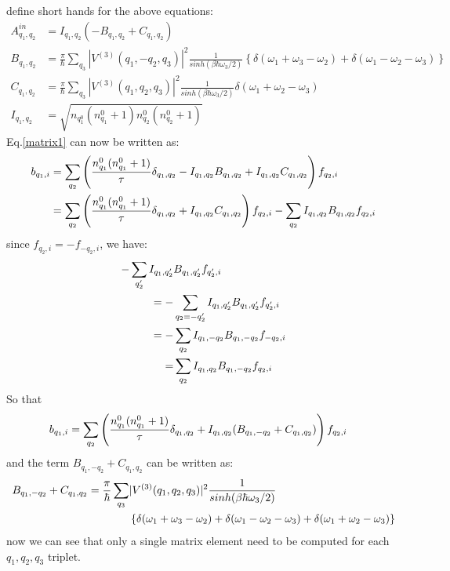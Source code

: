 \documentclass{article}
\begin{document}
define short hands for the above equations:
\begin{align}
    A^{in}_{q_1,q_2} &= I_{q_1,q_2} (-B_{q_1,q_2} + C_{q_1,q_2}) \\
    B_{q_1,q_2} &= \frac{\pi}{\hbar} \sum_{q_3} |V^{(3)}(q_1, -q_2, q_3)|^2 \frac{1}{sinh(\beta\hbar\omega_3 / 2)} 
                \left\{\delta(\omega_1 + \omega_3 - \omega_2) + \delta(\omega_1 - \omega_2 - \omega_3) \right\} \\
    C_{q_1,q_2} &= \frac{\pi}{\hbar} \sum_{q_3} |V^{(3)}(q_1, q_2, q_3)|^2 \frac{1}{sinh(\beta\hbar\omega_3 / 2)}  \delta(\omega_1 + \omega_2 - \omega_3) \\
    I_{q_1,q_2} &= \sqrt{n_{q_1^0}(n_{q_1}^0 + 1)n_{q_2}^0(n_{q_2}^0 + 1)}
\end{align}
Eq.\ref{matrix1} can now be written as:
\begin{align}
    b_{q_1,i} &=\sum_{q_2} \left( \frac{n_{q_1}^0 (n_{q_1}^0 + 1)}{\tau} \delta_{q_1,q_2} - I_{q_1,q_2} B_{q_1,q_2} + I_{q_1,q_2} C_{q_1,q_2} \right) f_{q_2,i} \notag \\
            &=\sum_{q_2} \left( \frac{n_{q_1}^0 (n_{q_1}^0 + 1)}{\tau} \delta_{q_1,q_2} + I_{q_1,q_2} C_{q_1,q_2} \right) f_{q_2,i} - \sum_{q_2} I_{q_1,q_2} B_{q_1,q_2}f_{q_2,i}
\end{align}
since $f_{q_2,i} = -f_{-q_2,i}$, we have:
\begin{align}
    - \sum_{q_2'} I_{q_1,q_2'} &B_{q_1,q_2'}f_{q_2',i} \notag \\ 
     = - &\sum_{q_2 = -q_2'} I_{q_1,q_2'} B_{q_1,q_2'}f_{q_2',i} \notag \\
     = - &\sum_{q_2} I_{q_1,-q_2} B_{q_1,-q_2}f_{-q_2,i} \notag \\
     = &\sum_{q_2} I_{q_1,q_2} B_{q_1,-q_2} f_{q_2,i}
\end{align}
So that
\begin{align}
    b_{q_1,i} &=\sum_{q_2} \left( \frac{n_{q_1}^0 (n_{q_1}^0 + 1)}{\tau} \delta_{q_1,q_2} + I_{q_1,q_2} ( B_{q_1,-q_2} + C_{q_1,q_2} ) \right) f_{q_2,i} \notag 
\end{align}
and the term $B_{q_1,-q_2} + C_{q_1,q_2}$ can be written as:
\begin{align}
    B_{q_1,-q_2} + C_{q_1,q_2} = \frac{\pi}{\hbar} \sum_{q_3} &|V^{(3)}(q_1, q_2, q_3)|^2 \frac{1}{sinh(\beta\hbar\omega_3 / 2)} \notag \\
    &\left\{ \delta(\omega_1 + \omega_3 - \omega_2) + \delta(\omega_1 - \omega_2 - \omega_3) + \delta(\omega_1 + \omega_2 - \omega_3) \right\}
\end{align}
now we can see that only a single matrix element need to be computed for each $q_1,q_2,q_3$ triplet.
\end{document}
